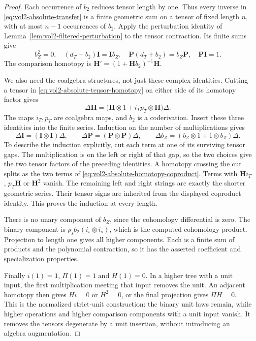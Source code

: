 \begin{proof}
Each occurrence of $b_2$ reduces tensor length by one.
Thus every inverse in \eqref{eq:vol2-absolute-transfer}
is a finite geometric sum on a tensor of fixed length $n$,
with at most $n-1$ occurrences of $b_2$.
Apply the perturbation identity of
Lemma~\ref{lem:vol2-filtered-perturbation} to the tensor
contraction. Its finite sums give
\[
 b_Z^2=0,
 \quad (d_T+b_2)\mathbf I=\mathbf I b_Z,
 \quad \mathbf P(d_T+b_2)=b_Z\mathbf P,
 \quad \mathbf P\mathbf I=1.
\]
The comparison homotopy is
$\mathbf H'=(1+\mathbf H b_2)^{-1}\mathbf H$.

We also need the coalgebra structures, not just these complex
identities. Cutting a tensor in
\eqref{eq:vol2-absolute-tensor-homotopy} on either side of
its homotopy factor gives
\begin{equation}\label{eq:vol2-absolute-homotopy-coproduct}
 \Delta\mathbf H
   =\bigl(\mathbf H\otimes1+i_Tp_T\otimes\mathbf H\bigr)\Delta.
\end{equation}
The maps $i_T,p_T$ are coalgebra maps, and $b_2$ is a
coderivation. Insert these three identities into the finite
series. Induction on the number of multiplications gives
\[
 \Delta\mathbf I=(\mathbf I\otimes\mathbf I)\Delta,
 \qquad
 \Delta\mathbf P=(\mathbf P\otimes\mathbf P)\Delta,
 \qquad
 \Delta b_Z=(b_Z\otimes1+1\otimes b_Z)\Delta.
\]
To describe the induction explicitly, cut each term at one
of its surviving tensor gaps. The multiplication is on the
left or right of that gap, so the two choices give the two
tensor factors of the preceding identities. A homotopy crossing
the cut splits as the two terms of
\eqref{eq:vol2-absolute-homotopy-coproduct}.
Terms with $\mathbf H i_T$, $p_T\mathbf H$ or
$\mathbf H^2$ vanish. The remaining left and right strings
are exactly the shorter geometric series. Their tensor signs
are inherited from the displayed coproduct identity.
This proves the induction at every length.

There is no unary component of $b_Z$, since the cohomology
differential is zero. The binary component is
$p_sb_2(i_s\otimes i_s)$, which is the computed cohomology
product. Projection to length one gives all higher components.
Each is a finite sum of products and the polynomial contraction,
so it has the asserted coefficient and specialization properties.

Finally $i(1)=1$, $\Pi(1)=1$ and $H(1)=0$.
In a higher tree with a unit input, the first multiplication
meeting that input removes the unit. An adjacent homotopy
then gives $Hi=0$ or $H^2=0$, or the final projection gives
$\Pi H=0$. This is the normalized strict-unit construction:
the binary unit laws remain, while higher operations and higher
comparison components with a unit input vanish.
It removes the tensors degenerate by a unit insertion, without
introducing an algebra augmentation.
\end{proof}

